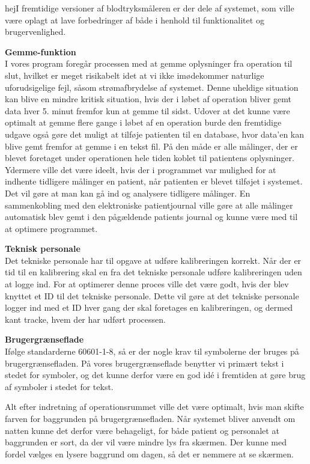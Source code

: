 hejI fremtidige versioner af blodtryksmåleren er der dele af systemet, som ville være oplagt at lave forbedringer af både i henhold til funktionalitet og brugervenlighed. 

\textbf{Gemme-funktion}
\\I vores program foregår processen med at gemme oplysninger fra operation til slut, hvilket er meget risikabelt idet at vi ikke imødekommer naturlige uforudsigelige fejl, såsom strømafbrydelse af systemet. Denne uheldige situation kan blive en mindre kritisk situation, hvis der i løbet af operation bliver gemt data hver 5. minut fremfor kun at gemme til sidst.
Udover at det kunne være optimalt at gemme flere gange i løbet af en operation burde den fremtidige udgave også gøre det muligt at tilføje patienten til en database, hvor data’en kan blive gemt fremfor at gemme i en tekst fil. På den måde er alle målinger, der er blevet foretaget under operationen hele tiden koblet til patientens oplysninger. Ydermere ville det være ideelt, hvis der i programmet var mulighed for at indhente tidligere målinger en patient, når patienten er blevet tilføjet i systemet. Det vil gøre at man kan gå ind og analysere tidligere målinger. En sammenkobling med den elektroniske patientjournal ville gøre at alle målinger automatisk blev gemt i den pågældende patients journal og kunne være med til at optimere programmet.

\textbf{Teknisk personale}
\\Det tekniske personale har til opgave at udføre kalibreringen korrekt. Når der er tid til en kalibrering skal en fra det tekniske personale udføre kalibreringen uden at logge ind. For at optimerer denne proces ville det være godt, hvis der blev knyttet et ID til det tekniske personale. Dette vil gøre at det tekniske personale logger ind med et ID hver gang der skal foretages en kalibreringen, og dermed kant tracke, hvem der har udført processen.

\textbf{Brugergrænseflade}
\\Ifølge standarderne 60601-1-8, så er der nogle krav til symbolerne der bruges på brugergrænsefladen. På vores brugergrænseflade benytter vi primært tekst i stedet for symboler, og det kunne derfor være en god idé i fremtiden at gøre brug af symboler i stedet for tekst.

Alt efter indretning af operationsrummet ville det være optimalt, hvis man skifte farven for baggrunden på brugergrænsefladen. Når systemet bliver anvendt om natten kunne det derfor være behageligt, for både patient og personalet at baggrunden er sort, da der vil være mindre lys fra skærmen. Der kunne med fordel vælges en lysere baggrund om dagen, så det er nemmere at se skærmen.

